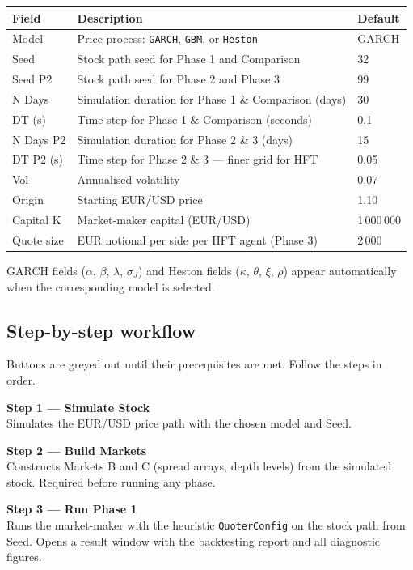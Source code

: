 \documentclass[12pt,a4paper]{article}
\begin{document}
\begin{center}
\begin{tabular}{lll}
\toprule
\textbf{Field} & \textbf{Description} & \textbf{Default} \\
\midrule
Model       & Price process: \texttt{GARCH}, \texttt{GBM}, or \texttt{Heston} & GARCH \\
Seed        & Stock path seed for Phase 1 and Comparison & 32 \\
Seed P2     & Stock path seed for Phase 2 and Phase 3 & 99 \\
N Days      & Simulation duration for Phase 1 \& Comparison (days) & 30 \\
DT (s)      & Time step for Phase 1 \& Comparison (seconds) & 0.1 \\
N Days P2   & Simulation duration for Phase 2 \& 3 (days) & 15 \\
DT P2 (s)   & Time step for Phase 2 \& 3 --- finer grid for HFT & 0.05 \\
Vol         & Annualised volatility & 0.07 \\
Origin      & Starting EUR/USD price & 1.10 \\
Capital K   & Market-maker capital (EUR/USD) & 1\,000\,000 \\
Quote size  & EUR notional per side per HFT agent (Phase 3) & 2\,000 \\
\bottomrule
\end{tabular}
\end{center}

GARCH fields ($\alpha$, $\beta$, $\lambda$, $\sigma_J$) and Heston fields
($\kappa$, $\theta$, $\xi$, $\rho$) appear automatically when the corresponding
model is selected.

\subsection*{Step-by-step workflow}

Buttons are greyed out until their prerequisites are met. Follow the steps in order.

\medskip
\noindent\textbf{Step 1 --- Simulate Stock}\\
Simulates the EUR/USD price path with the chosen model and Seed.

\medskip
\noindent\textbf{Step 2 --- Build Markets}\\
Constructs Markets B and C (spread arrays, depth levels) from the simulated
stock. Required before running any phase.

\medskip
\noindent\textbf{Step 3 --- Run Phase 1}\\
Runs the market-maker with the heuristic \texttt{QuoterConfig} on the stock
path from Seed. Opens a result window with the backtesting report and all
diagnostic figures.
\end{document}
